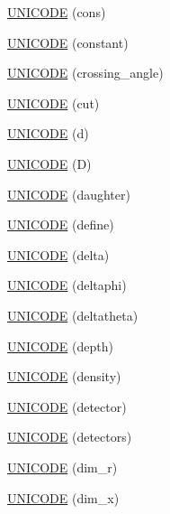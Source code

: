 \begin{DoxyCompactItemize}
\item 
\hyperlink{namespace_d_d4hep_1_1_x_m_l_a5d361e9f15792828cd571e4f7f02c745}{U\+N\+I\+C\+O\+DE} (cons)
\item 
\hyperlink{namespace_d_d4hep_1_1_x_m_l_a44ae68f8355a2198dd8d202ef478b21a}{U\+N\+I\+C\+O\+DE} (constant)
\item 
\hyperlink{namespace_d_d4hep_1_1_x_m_l_abe108ea0fd616f2ab19be533684554f3}{U\+N\+I\+C\+O\+DE} (crossing\+\_\+angle)
\item 
\hyperlink{namespace_d_d4hep_1_1_x_m_l_a1dde75438831801262d7883f65f97435}{U\+N\+I\+C\+O\+DE} (cut)
\item 
\hyperlink{namespace_d_d4hep_1_1_x_m_l_a5f4b54a4badf26042f974751d080bc2a}{U\+N\+I\+C\+O\+DE} (d)
\item 
\hyperlink{namespace_d_d4hep_1_1_x_m_l_a063d918c9f7bc329c92e5904213e7afd}{U\+N\+I\+C\+O\+DE} (D)
\item 
\hyperlink{namespace_d_d4hep_1_1_x_m_l_a5e589c14c7bfdeb2f294317b5d4214b8}{U\+N\+I\+C\+O\+DE} (daughter)
\item 
\hyperlink{namespace_d_d4hep_1_1_x_m_l_adac17977c4019c0eac929423e3b8acc4}{U\+N\+I\+C\+O\+DE} (define)
\item 
\hyperlink{namespace_d_d4hep_1_1_x_m_l_acb3e7a8633cc0772b2d1f3e99cddc1db}{U\+N\+I\+C\+O\+DE} (delta)
\item 
\hyperlink{namespace_d_d4hep_1_1_x_m_l_ab0c5123d2399c4ce112e0ca91f1bfeff}{U\+N\+I\+C\+O\+DE} (deltaphi)
\item 
\hyperlink{namespace_d_d4hep_1_1_x_m_l_acefe8204b97c6e602b993e98368f9280}{U\+N\+I\+C\+O\+DE} (deltatheta)
\item 
\hyperlink{namespace_d_d4hep_1_1_x_m_l_ae9d57b3e1def56fa5e6a1399ae974c60}{U\+N\+I\+C\+O\+DE} (depth)
\item 
\hyperlink{namespace_d_d4hep_1_1_x_m_l_a1ced206794b90b58397092707dff1bf1}{U\+N\+I\+C\+O\+DE} (density)
\item 
\hyperlink{namespace_d_d4hep_1_1_x_m_l_ab73d6563cf5e1aa36db067b3f34bd88f}{U\+N\+I\+C\+O\+DE} (detector)
\item 
\hyperlink{namespace_d_d4hep_1_1_x_m_l_a1f5ae3719f4865d4b02790e630d5f390}{U\+N\+I\+C\+O\+DE} (detectors)
\item 
\hyperlink{namespace_d_d4hep_1_1_x_m_l_ad856ff15b771c2efa5e93c75b751ba04}{U\+N\+I\+C\+O\+DE} (dim\+\_\+r)
\item 
\hyperlink{namespace_d_d4hep_1_1_x_m_l_adf88fd89648b4bd7232f8c9fedd52d29}{U\+N\+I\+C\+O\+DE} (dim\+\_\+x)
\item 

\end{DoxyCompactItemize}
